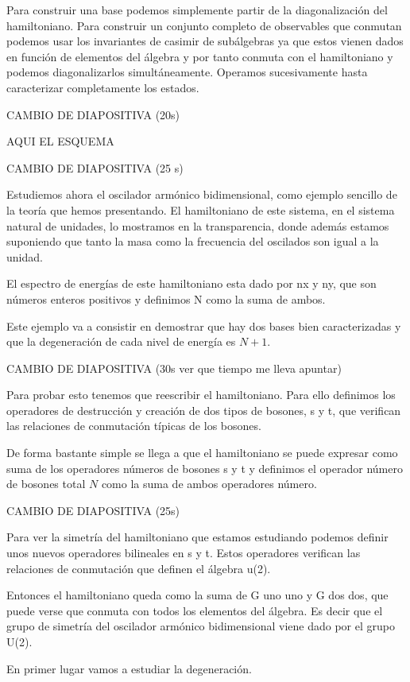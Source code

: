 \documentclass[a4paper,12pt,twoside]{article}
\begin{document}
Para construir una base podemos simplemente partir de la diagonalización del hamiltoniano. Para construir un conjunto completo de observables que conmutan podemos usar los invariantes de casimir de subálgebras ya que estos vienen dados en función de elementos del álgebra y por tanto conmuta con el hamiltoniano y podemos diagonalizarlos simultáneamente. Operamos sucesivamente hasta caracterizar completamente los estados.

CAMBIO DE DIAPOSITIVA (20s)

AQUI EL ESQUEMA

CAMBIO DE DIAPOSITIVA (25 s)

Estudiemos ahora  el oscilador armónico bidimensional, como ejemplo sencillo de la teoría que hemos presentando. El hamiltoniano de este sistema, en el sistema natural de unidades, lo mostramos en la transparencia, donde además estamos suponiendo que tanto la masa como la frecuencia del oscilados son igual a la unidad.

El espectro de energías de este hamiltoniano esta dado por nx y ny, que son números enteros positivos y definimos N como la suma de ambos.

Este ejemplo va a consistir en demostrar que hay dos bases bien caracterizadas y que la degeneración de cada nivel de energía es $N+1$.

CAMBIO DE DIAPOSITIVA (30s ver que tiempo me lleva apuntar)

Para probar esto tenemos que reescribir el hamiltoniano. Para ello definimos los operadores de destrucción y creación de dos tipos de bosones, s y t, que verifican las relaciones de conmutación típicas de los bosones. 

De forma bastante simple se llega a que el hamiltoniano se puede expresar como suma de los operadores números de bosones s y t y definimos el operador número de bosones total $N$ como la suma de ambos operadores número.

CAMBIO DE DIAPOSITIVA (25s)

Para ver la simetría del hamiltoniano que estamos estudiando podemos definir unos nuevos operadores bilineales en s y t.
Estos operadores verifican las relaciones de conmutación que definen el álgebra u(2). 

Entonces el hamiltoniano queda como la suma de G uno uno y G dos dos, que puede verse que conmuta con todos los elementos del álgebra. Es decir que el grupo de simetría del oscilador armónico bidimensional viene dado por el grupo U(2). 

En primer lugar vamos a estudiar la degeneración.
\end{document}
